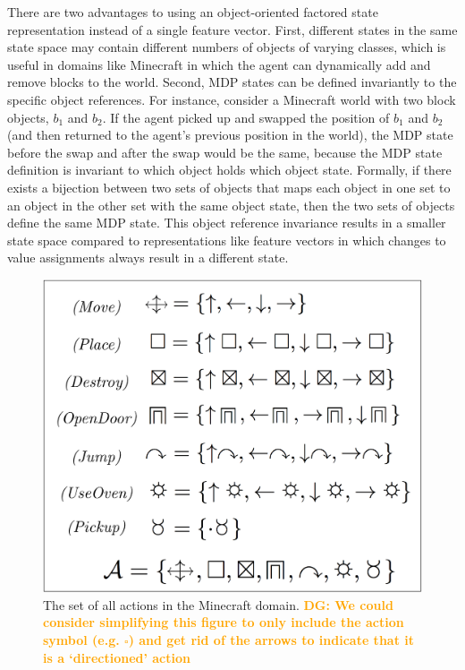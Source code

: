 \documentclass[]{article}
\newcommand{\dgnote}[1]{\textcolor{Orange}{\textbf{DG: #1}}}
\begin{document}
There are two advantages to using an object-oriented factored state
representation instead of a single feature vector. First, different
states in the same state space may contain different numbers of
objects of varying classes, which is useful in domains like Minecraft
in which the agent can dynamically add and remove blocks to the
world. Second, MDP states can be defined invariantly to the specific
object references.  For instance, consider a Minecraft world with two
block objects, $b_1$ and $b_2$.  If the agent picked up and swapped
the position of $b_1$ and $b_2$ (and then returned to the agent's
previous position in the world), the MDP state before the swap and
after the swap would be the same, because the MDP state definition is
invariant to which object holds which object state.  Formally, if
there exists a bijection between two sets of objects that maps each
object in one set to an object in the other set with the same object
state, then the two sets of objects define the same MDP state.  This
object reference invariance results in a smaller state space compared
to representations like feature vectors in which changes to value
assignments always result in a different state.

\begin{figure}
\centering
\includegraphics[scale = 0.15]{figures/all_actions.png}
\caption{The set of all actions in the Minecraft domain. \label{fig:all_actions} \dgnote{We could consider simplifying this figure to only include the action symbol (e.g. $\square$) and get rid of the arrows to indicate that it is a `directioned' action}}
\end{figure}
\end{document}
